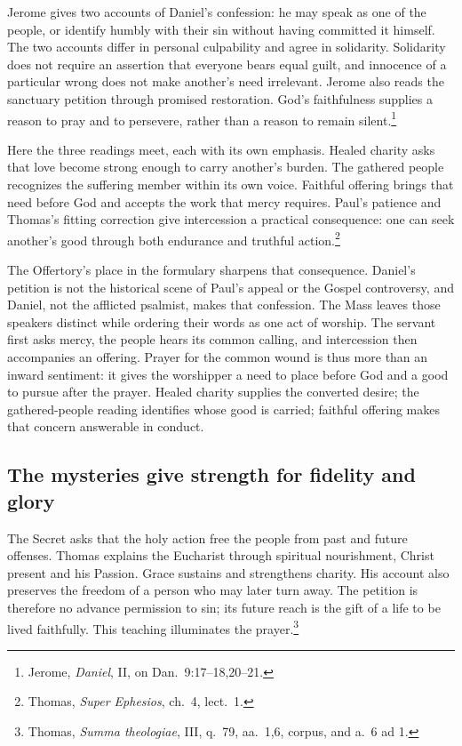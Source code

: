 Jerome gives two accounts of Daniel's confession: he may speak as one of the people, or identify humbly with their sin without having committed it himself. The two accounts differ in personal culpability and agree in solidarity. Solidarity does not require an assertion that everyone bears equal guilt, and innocence of a particular wrong does not make another's need irrelevant. Jerome also reads the sanctuary petition through promised restoration. God's faithfulness supplies a reason to pray and to persevere, rather than a reason to remain silent.\footnote{Jerome, \textit{Daniel}, II, on Dan.~9:17--18,20--21.}

Here the three readings meet, each with its own emphasis. Healed charity asks that love become strong enough to carry another's burden. The gathered people recognizes the suffering member within its own voice. Faithful offering brings that need before God and accepts the work that mercy requires. Paul's patience and Thomas's fitting correction give intercession a practical consequence: one can seek another's good through both endurance and truthful action.\footnote{Thomas, \textit{Super Ephesios}, ch.~4, lect.~1.}

The Offertory's place in the formulary sharpens that consequence. Daniel's petition is not the historical scene of Paul's appeal or the Gospel controversy, and Daniel, not the afflicted psalmist, makes that confession. The Mass leaves those speakers distinct while ordering their words as one act of worship. The servant first asks mercy, the people hears its common calling, and intercession then accompanies an offering. Prayer for the common wound is thus more than an inward sentiment: it gives the worshipper a need to place before God and a good to pursue after the prayer. Healed charity supplies the converted desire; the gathered-people reading identifies whose good is carried; faithful offering makes that concern answerable in conduct.

\subsection{The mysteries give strength for fidelity and glory}
The Secret asks that the holy action free the people from past and future offenses. Thomas explains the Eucharist through spiritual nourishment, Christ present and his Passion. Grace sustains and strengthens charity. His account also preserves the freedom of a person who may later turn away. The petition is therefore no advance permission to sin; its future reach is the gift of a life to be lived faithfully. This teaching illuminates the prayer.\footnote{Thomas, \textit{Summa theologiae}, III, q.~79, aa.~1,6, corpus, and a.~6 ad 1.}


